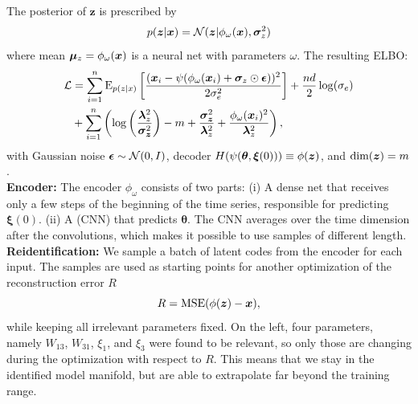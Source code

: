 \documentclass[25pt]{tikzposter}
\begin{document}
\begin{columns}
{    The posterior of $\bm z$ is prescribed by
    \begin{align}
      \label{eq:ard_posterior}
      p(\bm{z}|\bm{x}) = \mathcal{N}(\bm{z}|\phi_\omega(\bm{x}), \bm{\sigma}_z^2)
    \end{align}
    where mean $\bm{\mu}_{z}=\phi_\omega(\bm{x})$ is a neural net with parameters
    $\omega$.
    The resulting ELBO:
    {\fontsize{25}{20}
    \begin{equation}
    \begin{aligned}
      \label{eq:elbo_reparam}
      \mathcal{L} &= \sum_{i=1}^n \text{E}_{p(z|x)}\left[\frac{(\bm{x}_i - \psi(\phi_\omega(\bm{x}_i) + \bm{\sigma}_z \odot \bm{\epsilon}))^2}{2\sigma_e^2}\right]
                  + \frac{nd}{2}\log(\sigma_e) \\
                  &+ \sum_{i=1}^n \left(
                      \log\left(\frac{\bm{\lambda}_z^2}{\bm{\sigma_z}^2}\right)
                      -m + \frac{\bm{\sigma_z}^2}{\bm{\lambda}_z^2} + \frac{\phi_\omega(\bm{x}_i)^2}{\bm{\lambda}_z^2}
                  \right),
    \end{aligned}
    \end{equation}}
    with Gaussian noise $\bm{\epsilon} \sim \mathcal{N}(0,I)$, decoder
    $H(\psi(\bm\theta,\bm\xi(0)))\equiv\phi(\bm{z})$, and $\text{dim}(\bm{z}) = m$.\\

    \textbf{Encoder:} The encoder $\phi_\omega$ consists of two parts: (i) A
    dense net that receives only a few steps of the beginning of the time
    series, responsible for predicting $\bm \xi(0)$. (ii) A (CNN) that predicts
    $\bm \theta$.  The CNN averages over the time dimension after the
    convolutions, which makes it possible to use samples of different length.\\

    \textbf{Reidentification:} We sample a batch of
    latent codes from the encoder for each input.  The samples
    are used as starting points for another optimization of the reconstruction
    error $R$
    \begin{equation}
      R = \mathrm{MSE}(\phi(\bm z) - \bm{x}),
    \end{equation}
    while keeping all irrelevant parameters fixed.
    On the left, four parameters, namely $W_{13}$,
    $W_{31}$, $\xi_{1}$, and $\xi_{3}$ were found to be relevant, so only
    those are changing during the optimization with respect to $R$.
    This means that we stay in the identified model manifold, but are able to
    extrapolate far beyond the training range.   

    \vspace{1.35cm}
  }
  
\end{columns}
\end{document}
